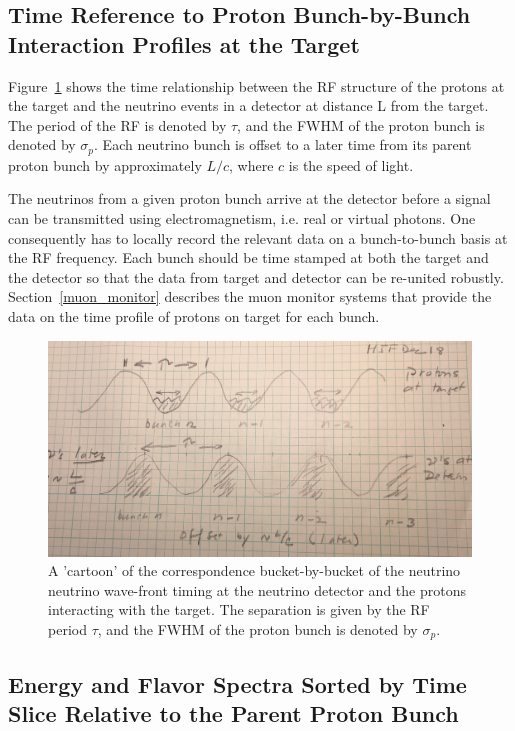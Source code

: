 \subsection{Time Reference to Proton Bunch-by-Bunch Interaction
  Profiles at the Target}
\label{time_reference}

Figure~\ref{fig:bucket_timing} shows the time relationship between the
RF structure of the protons at the target and the neutrino events in a
detector at distance L from the target. The period of the RF is
denoted by $\tau$, and the FWHM of the proton bunch is denoted by
$\sigma_p$. Each neutrino bunch is offset to a later time from its
parent proton bunch by approximately $L/c$, where $c$ is the speed of
light.

The neutrinos from a given proton bunch arrive at the detector before
a signal can be transmitted using electromagnetism, i.e. real or
virtual photons. One consequently has to locally record the relevant
data on a bunch-to-bunch basis at the RF frequency. Each bunch should be
time stamped at both the target and the detector so that the data from
target and detector can be re-united
robustly. Section~\ref{muon_monitor} describes the muon monitor
systems that provide the data on the time profile of protons on target
for each bunch. 

\begin{figure}[ht]
	\begin{center}
           	\includegraphics[width=0.7 \linewidth]{Figures/nupaper_timing_IMG_5836_crop.jpg}
	\end{center}
	\caption{A 'cartoon' of the correspondence bucket-by-bucket of
          the neutrino neutrino wave-front timing at the neutrino
          detector and the protons interacting with the target. The
          separation is given by the RF period $\tau$, and the FWHM of
        the proton bunch is denoted by $\sigma_p$.}
	\label{fig:bucket_timing}
\end{figure}

\subsection{Energy and Flavor Spectra Sorted by Time Slice Relative to
the Parent Proton Bunch}
\label{spectra}



